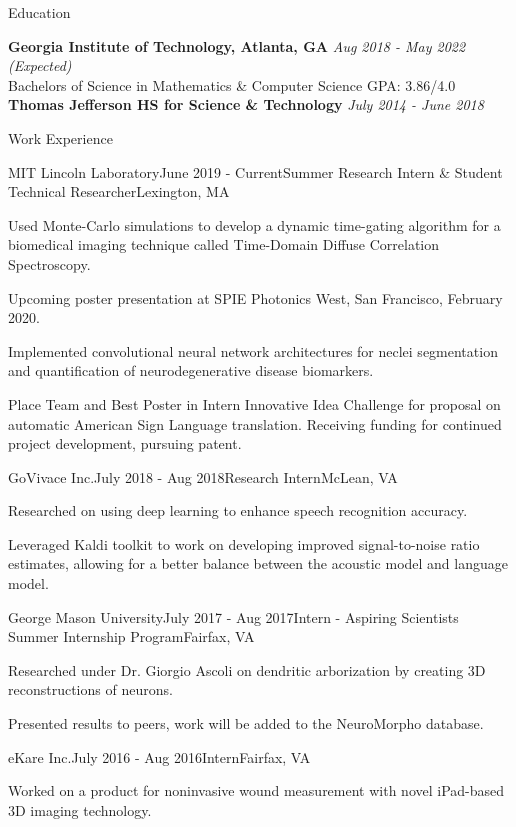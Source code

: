 \documentclass{template} %
\begin{document}

\begin{rSection}{Education}

{\bf Georgia Institute of Technology, Atlanta, GA} \hfill {\em Aug 2018 - May 2022 (Expected)}
\\ Bachelors of Science in Mathematics \& Computer Science \hfill  GPA: 3.86/4.0 \medskip
\\ {\bf Thomas Jefferson HS for Science \& Technology} \hfill {\em July 2014 - June 2018}
\end{rSection}


\begin{rSection}{Work Experience}

\begin{rSubsection}{MIT Lincoln Laboratory}{June 2019 - Current}{Summer Research Intern \& Student Technical Researcher}{Lexington, MA}
\item Used Monte-Carlo simulations to develop a  dynamic time-gating algorithm for a biomedical imaging technique called Time-Domain Diffuse Correlation Spectroscopy. 
\item Upcoming poster presentation at SPIE Photonics West, San Francisco, February 2020.
\item Implemented convolutional neural network architectures for neclei segmentation and quantification of neurodegenerative disease biomarkers.
\item{} Place Team and Best Poster in Intern Innovative Idea Challenge for proposal on automatic American Sign Language translation. Receiving funding for continued project development, pursuing patent.
\end{rSubsection}

\begin{rSubsection}{GoVivace Inc.}{July 2018 - Aug 2018}{Research Intern}{McLean, VA}
\item Researched on using deep learning to enhance speech recognition accuracy.
\item Leveraged Kaldi toolkit to work on developing improved signal-to-noise ratio estimates, allowing for a better balance between the acoustic model and language model.
\end{rSubsection}

\begin{rSubsection}{George Mason University}{July 2017 - Aug 2017}{Intern - Aspiring Scientists Summer Internship Program}{Fairfax, VA}
\item Researched under Dr. Giorgio Ascoli on dendritic arborization by creating 3D reconstructions of neurons.
\item Presented results to peers, work will be added to the NeuroMorpho database.
\end{rSubsection}

\begin{rSubsection}{eKare Inc.}{July 2016 - Aug 2016}{Intern}{Fairfax, VA}
\item Worked on a product for noninvasive wound measurement with novel iPad-based 3D imaging technology.
\end{rSubsection}

\end{rSection}
\end{document}
